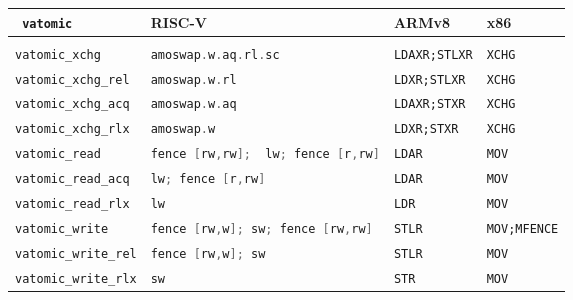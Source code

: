 \begin{tabular}{l|lll}
    \small {\tt\color{libvsync} vatomic} & \small RISC-V & \small ARMv8 & \small x86
    \\
    \hline\\[-6pt]
    \lstinline[language=C,style=compact]|vatomic_xchg| & \lstinline[language={C},style=compact]|amoswap.w.aq.rl.sc| & %
    \lstinline[style=compact]|LDAXR;STLXR| & \lstinline[style=compact]|XCHG |\\
    \lstinline[language=C,style=compact]|vatomic_xchg_rel| & \lstinline[language={C},style=compact]|amoswap.w.rl| & %
    \lstinline[style=compact]|LDXR;STLXR| & \lstinline[style=compact]|XCHG |\\
    \lstinline[language=C,style=compact]|vatomic_xchg_acq| & \lstinline[language={C},style=compact]|amoswap.w.aq| & %
    \lstinline[style=compact]|LDAXR;STXR| & \lstinline[style=compact]|XCHG |\\
    \lstinline[language=C,style=compact]|vatomic_xchg_rlx| & \lstinline[language={C},style=compact]|amoswap.w| & %
    \lstinline[style=compact]|LDXR;STXR|  & \lstinline[style=compact]|XCHG|\\
    \lstinline[language=C,style=compact]|vatomic_read| & \lstinline[language={C},style=compact]|fence [rw,rw];  lw; fence [r,rw]| & \lstinline[style=compact]|LDAR| & \lstinline[style=compact]|MOV |\\
    \lstinline[language=C,style=compact]|vatomic_read_acq| & \lstinline[language={C},style=compact]|lw; fence [r,rw]| & \lstinline[style=compact]|LDAR|  & \lstinline[style=compact]|MOV|\\
    \lstinline[language=C,style=compact]|vatomic_read_rlx| & \lstinline[language={C},style=compact]|lw| &  \lstinline[style=compact]|LDR|  & \lstinline[style=compact]|MOV|\\
    \lstinline[language=C,style=compact]|vatomic_write| & \lstinline[language={C},style=compact]|fence [rw,w]; sw; fence [rw,rw]| & \lstinline[style=compact]|STLR|  & \lstinline[style=compact]|MOV;MFENCE|\\
    \lstinline[language=C,style=compact]|vatomic_write_rel| & \lstinline[language={C},style=compact]|fence [rw,w]; sw| & \lstinline[style=compact]|STLR|  & \lstinline[style=compact]|MOV|\\
    \lstinline[language=C,style=compact]|vatomic_write_rlx| & \lstinline[language={C},style=compact]|sw| & \lstinline[style=compact]|STR| & \lstinline[style=compact]|MOV|\\

\end{tabular}
